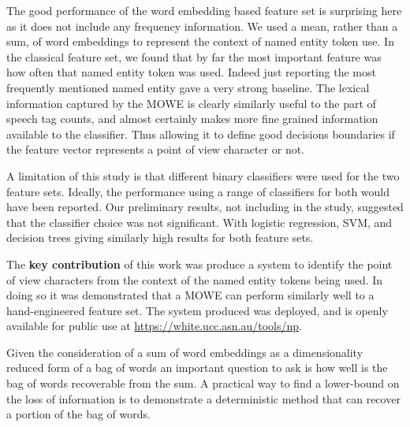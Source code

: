 \documentclass{book}
\begin{document}
The good performance of the word embedding based feature set is surprising here as it does not include any frequency information.
We used a mean, rather than a sum, of word embeddings to represent the context of named entity token use.
In the classical feature set, we found that by far the most important feature was how often that named entity token was used.
Indeed just reporting the most frequently mentioned named entity gave a very strong baseline.
The lexical information captured by the MOWE is clearly similarly useful to the part of speech tag counts, and almost certainly makes more fine grained information available to the classifier.
Thus allowing it to define good decisions boundaries if the feature vector represents a point of view character or not.


A limitation of this study is that different binary classifiers were used for the two feature sets.
Ideally, the performance using a range of classifiers for both would have been reported.
Our preliminary results, not including in the study, suggested that the classifier choice was not significant.
With logistic regression, SVM, and decision trees giving similarly high results for both feature sets.
 



The \textbf{key contribution} of this work was produce a system to identify the point of view characters from the context of the named entity tokens being used.
In doing so it was demonstrated that a MOWE can perform similarly well to a hand-engineered feature set.
The system produced was deployed, and is openly available for public use at \url{https://white.ucc.asn.au/tools/np}.


Given the consideration of a sum of word embeddings as a dimensionality reduced form of a bag of words
an important question to ask is how well is the bag of words recoverable from the sum.
A practical way to find a lower-bound  on the loss of information
is to demonstrate a deterministic method that can recover a portion of the bag of words.
\end{document}
